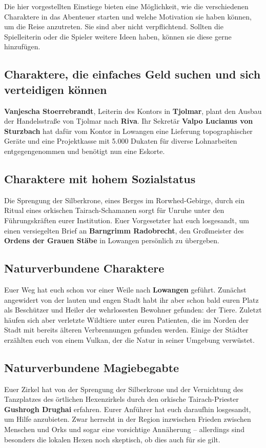 \neuespalte

Die hier vorgestellten Einstiege bieten eine Möglichkeit, wie die verschiedenen Charaktere in das Abenteuer starten und welche Motivation sie haben können, um die Reise anzutreten.
Sie sind aber nicht verpflichtend.
Sollten die Spielleiterin oder die Spieler weitere Ideen haben, können sie diese gerne hinzufügen.


\subsection*{Charaktere, die einfaches Geld suchen und sich verteidigen können}
\textbf{Vanjescha Stoerrebrandt}, Leiterin des Kontors in \textbf{Tjolmar}, plant den Ausbau der Handelsstraße von Tjolmar nach \textbf{Riva}.
Ihr Sekretär \textbf{Valpo Lucianus von Sturzbach} hat dafür vom Kontor in Lowangen eine Lieferung topographischer Geräte und eine Projektkasse mit 5.000 Dukaten für diverse Lohnarbeiten entgegengenommen und benötigt nun eine Eskorte.

\subsection*{Charaktere mit hohem Sozialstatus}
Die Sprengung der Silberkrone, eines Berges im Rorwhed-Gebirge, durch ein Ritual eines orkischen Tairach-Schamanen sorgt für Unruhe unter den Führungskräften eurer Institution.
Euer Vorgesetzter hat euch losgesandt, um einen versiegelten Brief an \textbf{Barngrimm Radobrecht}, den Großmeister des \textbf{Ordens der Grauen Stäbe} in Lowangen persönlich zu übergeben.

\subsection*{Naturverbundene Charaktere}
Euer Weg hat euch schon vor einer Weile nach \textbf{Lowangen} geführt.
Zunächst angewidert von der lauten und engen Stadt habt ihr aber schon bald euren Platz als Beschützer und Heiler der wehrlosesten Bewohner gefunden: der Tiere.
Zuletzt häufen sich aber verletzte Wildtiere unter euren Patienten, die im Norden der Stadt mit bereits älteren Verbrennungen gefunden werden.
Einige der Städter erzählten euch von einem Vulkan, der die Natur in seiner Umgebung verwüstet.


\subsection*{Naturverbundene Magiebegabte}
Euer Zirkel hat von der Sprengung der Silberkrone und der Vernichtung des Tanzplatzes des örtlichen Hexenzirkels durch den orkische Tairach-Priester \textbf{Gushrogh Drughai} erfahren.
Eurer Anführer hat euch daraufhin losgesandt, um Hilfe anzubieten.
Zwar herrscht in der Region inzwischen Frieden zwischen Menschen und Orks und sogar eine vorsichtige Annäherung --
allerdings sind besonders die lokalen Hexen noch skeptisch, ob dies auch für sie gilt.

